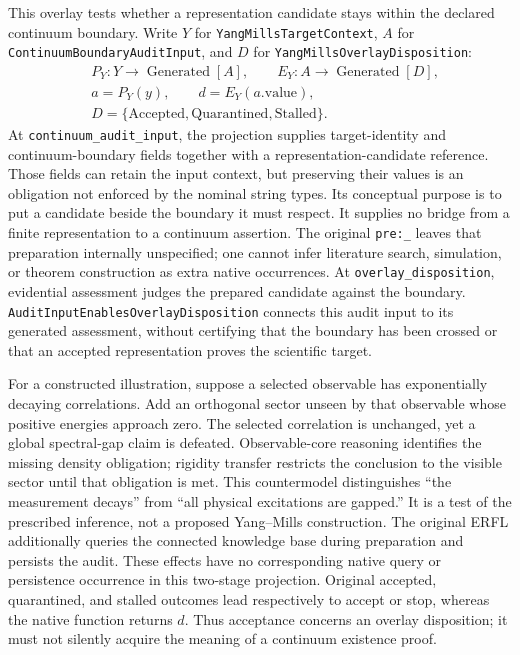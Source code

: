 This overlay tests whether a representation candidate stays within the declared
continuum boundary. Write $Y$ for \texttt{Yang\allowbreak Mills\allowbreak Target\allowbreak Context}, $A$ for
\texttt{Continuum\allowbreak Boundary\allowbreak Audit\allowbreak Input}, and $D$ for
\texttt{Yang\allowbreak Mills\allowbreak Overlay\allowbreak Disposition}:
\[
\begin{aligned}
&P_Y:Y\to\operatorname{Generated}[A],\qquad
 E_Y:A\to\operatorname{Generated}[D],\\
&a=P_Y(y),\qquad d=E_Y(a.\mathrm{value}),\\
&D=\{\mathrm{Accepted},\mathrm{Quarantined},\mathrm{Stalled}\}.
\end{aligned}
\]
At \texttt{continuum\_\allowbreak audit\_\allowbreak input}, the projection supplies target-identity and
continuum-boundary fields together with a representation-candidate reference.
Those fields can retain the input context, but preserving their values is an
obligation not enforced by the nominal string types.
Its conceptual purpose is to put a candidate beside the boundary it must respect.
It supplies no bridge from a finite representation to a continuum assertion.
The original \texttt{pre:\_\allowbreak } leaves that preparation internally unspecified;
one cannot infer literature search, simulation, or theorem construction as extra
native occurrences. At \texttt{overlay\_\allowbreak disposition}, evidential assessment
judges the prepared candidate against the boundary.
\texttt{Audit\allowbreak Input\allowbreak Enables\allowbreak Overlay\allowbreak Disposition} connects this audit input to its
generated assessment, without certifying that the boundary has been crossed or
that an accepted representation proves the scientific target.

For a constructed illustration, suppose a selected observable has exponentially
decaying correlations. Add an orthogonal sector unseen by that observable whose
positive energies approach zero. The selected correlation is unchanged, yet a
global spectral-gap claim is defeated. Observable-core reasoning identifies the
missing density obligation; rigidity transfer restricts the conclusion to the
visible sector until that obligation is met. This countermodel distinguishes
``the measurement decays'' from ``all physical excitations are gapped.'' It is a
test of the prescribed inference, not a proposed Yang--Mills construction.
The original ERFL additionally queries the connected knowledge base during
preparation and persists the audit. These effects have no corresponding native
query or persistence occurrence in this two-stage projection. Original accepted,
quarantined, and stalled outcomes lead respectively to accept or stop, whereas the
native function returns $d$. Thus acceptance concerns an overlay disposition;
it must not silently acquire the meaning of a continuum existence proof.

